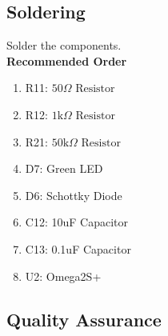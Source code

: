 \documentclass{article}
\newcommand{\resistor}[1]{$\text{#1} \Omega \text{ Resistor}$}
\begin{document}
\subsection{Soldering}

Solder the components. \\

\noindent \textbf{Recommended Order}

\begin{enumerate}
  \item R11: \resistor{50}
  \item R12: \resistor{1k} 
  \item R21: \resistor{50k}
  \item D7: Green LED
  \item D6: Schottky Diode
  \item C12: 10uF Capacitor
  \item C13: 0.1uF Capacitor  
  \item U2: Omega2S+
\end{enumerate}
\subsection{Quality Assurance}




\end{document}

